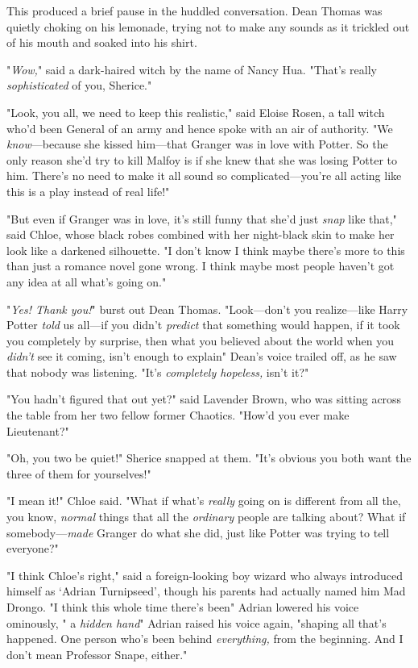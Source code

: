 This produced a brief pause in the huddled conversation. Dean Thomas was
quietly choking on his lemonade, trying not to make any sounds as it trickled
out of his mouth and soaked into his shirt.

"\emph{Wow,}" said a dark-haired witch by the name of Nancy Hua. "That's
really{\el} \emph{sophisticated} of you, Sherice."

"Look, you all, we need to keep this realistic," said Eloise Rosen, a tall
witch who'd been General of an army and hence spoke with an air of authority.
"We \emph{know}---because she kissed him---that Granger was in love with
Potter. So the only reason she'd try to kill Malfoy is if she knew that she was
losing Potter to him. There's no need to make it all sound so
complicated---you're all acting like this is a play instead of real life!"

"But even if Granger was in love, it's still funny that she'd just \emph{snap}
like that," said Chloe, whose black robes combined with her night-black skin to
make her look like a darkened silhouette. "I don't know{\el} I think maybe
there's more to this than just a romance novel gone wrong. I think maybe most
people haven't got any idea at all what's going on."

"\emph{Yes! Thank you!}" burst out Dean Thomas. "Look---don't you
realize---like Harry Potter \emph{told} us all---if you didn't \emph{predict}
that something would happen, if it took you completely by surprise, then what
you believed about the world when you \emph{didn't} see it coming, isn't enough
to explain{\el}" Dean's voice trailed off, as he saw that nobody was
listening. "It's \emph{completely hopeless,} isn't it?"

"You hadn't figured that out yet?" said Lavender Brown, who was sitting across
the table from her two fellow former Chaotics. "How'd you ever make Lieutenant?"

"Oh, you two be quiet!" Sherice snapped at them. "It's obvious you both want
the three of them for yourselves!"

"I mean it!" Chloe said. "What if what's \emph{really} going on is different
from all the, you know, \emph{normal} things that all the \emph{ordinary}
people are talking about? What if somebody---\emph{made} Granger do what she
did, just like Potter was trying to tell everyone?"

"I think Chloe's right," said a foreign-looking boy wizard who always
introduced himself as `Adrian Turnipseed', though his parents had actually
named him Mad Drongo. "I think this whole time there's been{\el}" Adrian
lowered his voice ominously, "{\el} a \emph{hidden hand}{\el}" Adrian
raised his voice again, "shaping all that's happened. One person who's been
behind \emph{everything,} from the beginning. And I don't mean Professor Snape,
either."

